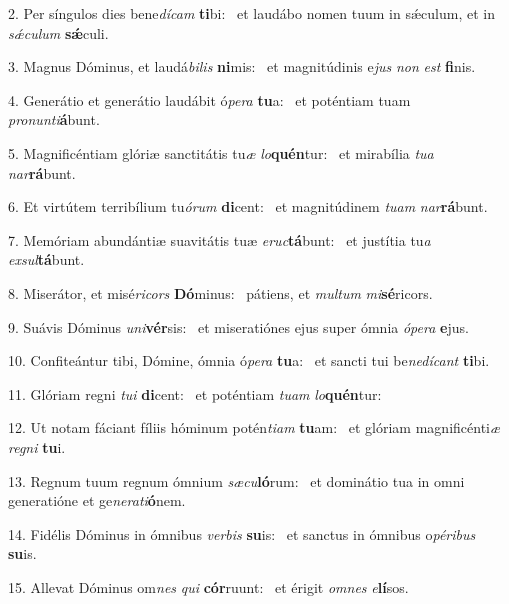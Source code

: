 2. Per síngulos dies bene\textit{dí}\textit{cam} \textbf{ti}bi: \ast\  et laudábo nomen tuum in sǽculum, et in \textit{sǽ}\textit{cu}\textit{lum} \textbf{sǽ}culi.\

3. Magnus Dóminus, et laudá\textit{bi}\textit{lis} \textbf{ni}mis: \ast\  et magnitúdinis e\textit{jus} \textit{non} \textit{est} \textbf{fi}nis.\

4. Generátio et generátio laudábit ó\textit{pe}\textit{ra} \textbf{tu}a: \ast\  et poténtiam tuam \textit{pro}\textit{nun}\textit{ti}\textbf{á}bunt.\

5. Magnificéntiam glóriæ sanctitátis tu\textit{æ} \textit{lo}\textbf{quén}tur: \ast\  et mirabília \textit{tu}\textit{a} \textit{nar}\textbf{rá}bunt.\

6. Et virtútem terribílium tu\textit{ó}\textit{rum} \textbf{di}cent: \ast\  et magnitúdinem \textit{tu}\textit{am} \textit{nar}\textbf{rá}bunt.\

7. Memóriam abundántiæ suavitátis tuæ \textit{e}\textit{ruc}\textbf{tá}bunt: \ast\  et justítia tu\textit{a} \textit{ex}\textit{sul}\textbf{tá}bunt.\

8. Miserátor, et misé\textit{ri}\textit{cors} \textbf{Dó}minus: \ast\  pátiens, et \textit{mul}\textit{tum} \textit{mi}\textbf{sé}ricors.\

9. Suávis Dóminus \textit{u}\textit{ni}\textbf{vér}sis: \ast\  et miseratiónes ejus super ómnia \textit{ó}\textit{pe}\textit{ra} \textbf{e}jus.\

10. Confiteántur tibi, Dómine, ómnia ó\textit{pe}\textit{ra} \textbf{tu}a: \ast\  et sancti tui be\textit{ne}\textit{dí}\textit{cant} \textbf{ti}bi.\

11. Glóriam regni \textit{tu}\textit{i} \textbf{di}cent: \ast\  et poténtiam \textit{tu}\textit{am} \textit{lo}\textbf{quén}tur:\

12. Ut notam fáciant fíliis hóminum potén\textit{ti}\textit{am} \textbf{tu}am: \ast\  et glóriam magnificénti\textit{æ} \textit{re}\textit{gni} \textbf{tu}i.\

13. Regnum tuum regnum ómnium \textit{sæ}\textit{cu}\textbf{ló}rum: \ast\  et dominátio tua in omni generatióne et ge\textit{ne}\textit{ra}\textit{ti}\textbf{ó}nem.\

14. Fidélis Dóminus in ómnibus \textit{ver}\textit{bis} \textbf{su}is: \ast\  et sanctus in ómnibus o\textit{pé}\textit{ri}\textit{bus} \textbf{su}is.\

15. Allevat Dóminus om\textit{nes} \textit{qui} \textbf{cór}ruunt: \ast\  et érigit \textit{om}\textit{nes} \textit{e}\textbf{lí}sos.\

